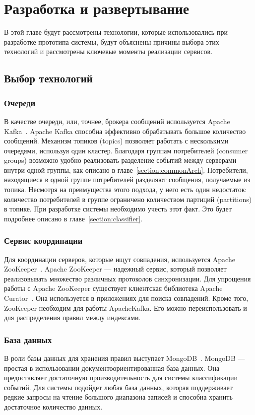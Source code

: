 \documentclass[14pt]{article}
\begin{document}
\section{Разработка и развертывание}
В этой главе будут рассмотрены технологии, которые использовались при разработке прототипа системы, будут объяснены причины выбора этих технологий и рассмотрены ключевые моменты реализации сервисов.

\subsection{Выбор технологий}
\subsubsection{Очереди}
В качестве очереди, или, точнее, брокера сообщений используется Apache Kafka~\cite{kafka}. Apache Kafka способна эффективно обрабатывать большое количество сообщений. Механизм топиков (topics) позволяет работать с несколькими очередями, используя один кластер. Благодаря группам потребителей (consumer groups) возможно удобно реализовать разделение событий между серверами внутри одной группы, как описано в главе~\ref{section:commonArch}. Потребители, находящиеся в одной группе потребителей разделяют сообщения, получаемые из топика. Несмотря на преимущества этого подхода, у него есть один недостаток: количество потребителей в группе ограничено количеством партиций (partitions) в топике. При разработке системы необходимо учесть этот факт. Это будет подробнее описано в главе~\ref{section:classifier}.

\subsubsection{Сервис координации}
Для координации серверов, которые ищут совпадения, используется Apache ZooKeeper~\cite{zookeeper}. Apache ZooKeeper --- надежный сервис, который позволяет реализовывать множество различных протоколов синхронизации. Для упрощения работы с Apache ZooKeeper существует клиентская библиотека Apache Curator~\cite{curator}. Она используется в приложениях для поиска совпадений. Кроме того, ZooKeeper необходим для работы ApacheKafka. Его можно переиспользовать и для распределения правил между индексами.

\subsubsection{База данных}
В роли базы данных для хранения правил выступает MongoDB~\cite{mongo}. MongoDB --- простая в использовании документоориентированная база данных. Она предоставляет достаточную производительность для системы классификации событий. Для системы подойдет любая база данных, которая поддерживает редкие запросы на чтение большого диапазона записей и способна хранить достаточное количество данных.
\end{document}
